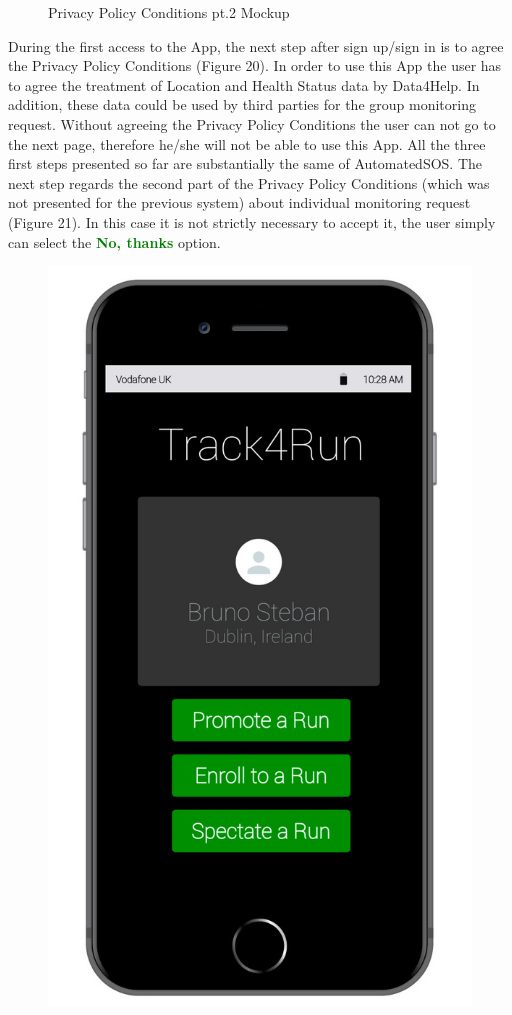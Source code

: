 \begin{enumerate}
\begin{figure}[H]
\begin{center}
\begin{minipage}[c]{.40\textwidth}
	\caption{Privacy Policy Conditions pt.2 Mockup}
        \end{minipage}
      \end{center}
\end{figure}
During the first access to the App, the next step after sign up/sign in is to agree the Privacy Policy Conditions (Figure 20). In order to use this App the user has to agree the treatment of Location and Health Status data by Data4Help. In addition, these data could be used by third parties for the group monitoring request. Without agreeing the Privacy Policy Conditions the user can not go to the next page, therefore he/she will not be able to use this App. All the three first steps presented so far are substantially the same of AutomatedSOS. The next step regards the second part of the Privacy Policy Conditions (which was not presented for the previous system) about individual monitoring request (Figure 21).  In this case it is not strictly necessary to accept it, the user simply can select the {\textcolor{Green}{\textbf{No, thanks}}} option.
\clearpage
\begin{figure}[H]
\begin{center}
        \begin{minipage}[c]{.40\textwidth}
        \centering
          \includegraphics[height=14 cm]{Images/Mockups/Track4RunMockup5.jpg}

\end{minipage}
\end{center}
\end{figure}
\end{enumerate}
